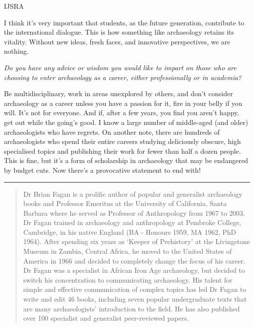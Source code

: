 \begin{labeling}{IJSRA}
\item[BMF] I think it’s very important that students, as the future generation, contribute to the international dialogue. This is how something like archaeology retains its vitality. Without new ideas, fresh faces, and innovative perspectives, we are nothing.

\item[IJSRA] \textit{Do you have any advice or wisdom you would like to impart on those who are choosing to enter archaeology as a career, either professionally or in academia?}

\item[BMF]Be multidisciplinary, work in areas unexplored by others, and don’t consider archaeology as a career unless you have a passion for it, fire in your belly if you will. It’s not for everyone. And if, after a few years, you find you aren’t happy, get out while the going’s good. I know a large number of middle-aged (and older) archaeologists who have regrets. On another note, there are hundreds of archaeologists who spend their entire careers studying deliciously obscure, high specialised topics and publishing their work for fewer than half a dozen people. This is fine, but it’s a form of scholarship in archaeology that may be endangered by budget cuts. Now there’s a provocative statement to end with!           

  \end{labeling}
\noindent\rule[0.5ex]{\linewidth}{1pt}

\blockquote{Dr Brian Fagan is a prolific author of popular and generalist archaeology books and Professor Emeritus at the University of California, Santa Barbara where he served as Professor of Anthropology from 1967 to 2003. Dr Fagan trained in archaeology and anthropology at Pembroke College, Cambridge, in his native England (BA - Honours 1959, MA 1962, PhD 1964). After spending six years as ‘Keeper of Prehistory’ at the Livingstone Museum in Zambia, Central Africa, he moved to the United States of America in 1966 and decided to completely change the focus of his career. Dr Fagan was a specialist in African Iron Age archaeology, but decided to switch his concentration to communicating archaeology. His talent for simple and effective communication of complex topics has led Dr Fagan to write and edit 46 books, including seven popular undergraduate texts that are many archaeologists’ introduction to the field. He has also published over 100 specialist and generalist peer-reviewed papers.}



	\label{Pasch:lastpage}
\closingarticle